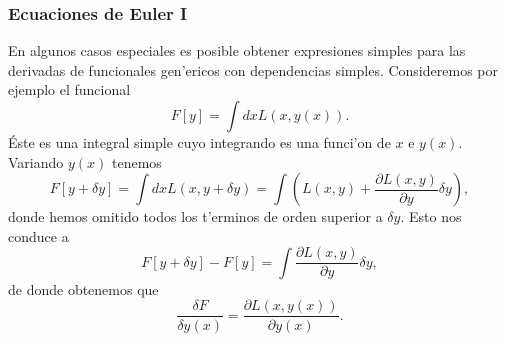 \subsubsection{Ecuaciones de Euler I}

En algunos casos especiales es posible obtener expresiones simples para las
derivadas de funcionales gen'ericos con dependencias simples. Consideremos por
ejemplo el funcional
\begin{equation}
F\left[ y\right] = \int dx L(x, y(x)).
\end{equation}
Éste es una integral simple cuyo integrando es una funci'on de $x$ e $y(x)$.
Variando $y(x)$ tenemos
\begin{equation}
F\left[ y+\delta y\right] = \int dx L(x, y+\delta y)=\int \left(
L(x,y)+\frac{\partial L(x,y)}{\partial y}\delta y\right), 
\end{equation}
donde hemos omitido todos los t'erminos de orden superior a $\delta y$. Esto nos
conduce a
\begin{equation}
F\left[ y+\delta y\right]-F\left[ y\right]=\int \frac{\partial L(x,y)}{\partial
y}\delta y, 
\end{equation}
de donde obtenemos que
\begin{equation}
\frac{\delta F}{\delta y(x)}=\frac{\partial L(x,y(x))}{\partial y(x)}.
\end{equation}

